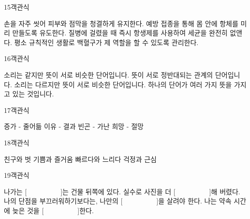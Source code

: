 \documentclass[fs95,seriesFre]{korfarm-base}
\begin{document}
\begin{kfQBlock}{15}{객관식}
\begin{kfChoices}
\kfChoice 손을 자주 씻어 피부와 점막을 청결하게 유지한다.
\kfChoice 예방 접종을 통해 몸 안에 항체를 미리 만들도록 유도한다.
\kfChoice 질병에 걸렸을 때 즉시 항생제를 사용하여 세균을 완전히 없앤다.
\kfChoice 평소 규칙적인 생활로 백혈구가 제 역할을 할 수 있도록 관리한다.
\end{kfChoices}
\end{kfQBlock}

\begin{kfQBlock}{16}{객관식}
\begin{kfChoices}
\kfChoice 소리는 같지만 뜻이 서로 비슷한 단어입니다.
\kfChoice 뜻이 서로 정반대되는 관계의 단어입니다.
\kfChoice 소리는 다르지만 뜻이 서로 비슷한 단어입니다.
\kfChoice 하나의 단어가 여러 가지 뜻을 가지고 있는 것입니다.
\end{kfChoices}
\end{kfQBlock}

\begin{kfQBlock}{17}{객관식}
\begin{kfChoices}
\kfChoice 증가 - 줄어듦
\kfChoice 이유 - 결과
\kfChoice 빈곤 - 가난
\kfChoice 희망 - 절망
\end{kfChoices}
\end{kfQBlock}

\begin{kfQBlock}{18}{객관식}
\begin{kfChoices}
\kfChoice 친구와 벗
\kfChoice 기쁨과 즐거움
\kfChoice 빠르다와 느리다
\kfChoice 걱정과 근심
\end{kfChoices}
\end{kfQBlock}

\begin{kfQBlock}{19}{객관식}
\begin{kfChoices}
\kfChoice 나가는 [　　　　　]는 건물 뒤쪽에 있다.
\kfChoice 실수로 사진을 더 [　　　　　]해 버렸다.
\kfChoice 나의 단점을 부끄러워하기보다는, 나만의 [　　　　　]을 살려야 한다.
\kfChoice 나는 약속 시간에 늦은 것을 [　　　　　]한다.
\end{kfChoices}
\end{kfQBlock}
\end{document}
